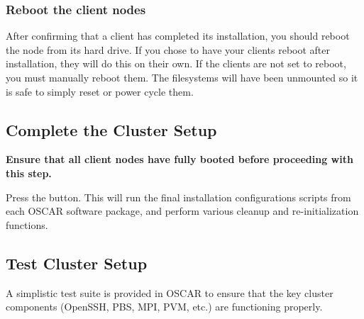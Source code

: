 \subsubsection{Reboot the client nodes}

After confirming that a client has completed its installation, you
should reboot the node from its hard drive. If you chose to have your
clients reboot after installation, they will do this on their
own. If the clients are not set to reboot, you must manually
reboot them. The filesystems will have been unmounted so it is safe
to simply reset or power cycle them.



\subsection{Complete the Cluster Setup}
\label{det:complete-cluster-setup}

{\bf Ensure that all client nodes have fully booted before proceeding
  with this step.}

Press the  button.  This will run the
final installation configurations scripts from each OSCAR software
package, and perform various cleanup and re-initialization functions.



\subsection{Test Cluster Setup}
\label{det:test-cluster}
            
A simplistic test suite is provided in OSCAR to ensure that the key
cluster components (OpenSSH, PBS, MPI, PVM, etc.) are functioning
properly.

